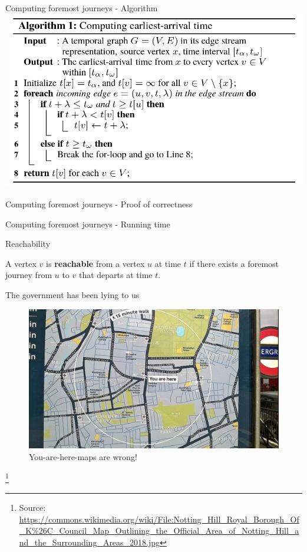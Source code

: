 \documentclass{beamer}
\newcommand{\sourcefootnote}[1]{\let\thefootnote\relax\footnote{{\tiny Source: \url{#1}}}}
\begin{document}
\begin{frame}{Computing foremost journeys - Algorithm}
  \includegraphics[width=\linewidth]{media/foremost_journey_algorithm.png}
  \cite[page 724]{PathProblems}
\end{frame}

\begin{frame}{Computing foremost journeys - Proof of correctness}


\end{frame}
\begin{frame}{Computing foremost journeys - Running time}

\end{frame}

\begin{frame}{Reachability}
	\begin{tcolorbox}[title=Definition: Reachability]
    A vertex $v$ is \textbf{reachable} from a vertex $u$ at time $t$ if there exists a foremost journey from $u$ to $v$ that departs at time $t$.
	\end{tcolorbox}
\end{frame}



\begin{frame}{The government has been lying to us}
	\begin{figure}
		\includegraphics[width=0.9\linewidth]{media/image_1737738340.png}
		\caption{You-are-here-maps are wrong!}
	\end{figure}
	\sourcefootnote{https://commons.wikimedia.org/wiki/File:Notting_Hill_Royal_Borough_Of_K\%26C_Council_Map_Outlining_the_Official_Area_of_Notting_Hill_and_the_Surrounding_Areas_2018.jpg}
\end{frame}
\end{document}

